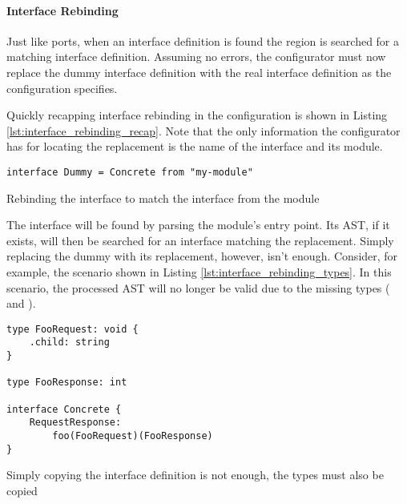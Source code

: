 \paragraph{Interface Rebinding}

Just like ports, when an interface definition is found the  region
is searched for a matching interface definition. Assuming no errors, the
configurator must now replace the dummy interface definition with the real
interface definition as the configuration specifies.

Quickly recapping interface rebinding in the configuration is shown in Listing
\ref{lst:interface_rebinding_recap}. Note that the only information the
configurator has for locating the replacement is the name of the interface and
its module.

\begin{listing}[H]
\begin{verbatim}
interface Dummy = Concrete from "my-module"
\end{verbatim}

\caption{Rebinding the interface  to match the interface
     from the module }

\label{lst:interface_rebinding_recap}

\end{listing}

The interface will be found by parsing the module's entry point. Its AST, if it
exists, will then be searched for an interface matching the replacement. Simply
replacing the dummy with its replacement, however, isn't enough. Consider, for
example, the scenario shown in Listing \ref{lst:interface_rebinding_types}. In
this scenario, the processed AST will no longer be valid due to the missing
types ( and ).

\begin{listing}[H]
\begin{verbatim}
type FooRequest: void {
    .child: string
}

type FooResponse: int

interface Concrete {
    RequestResponse:
        foo(FooRequest)(FooResponse)
}
\end{verbatim}

\caption{Simply copying the interface definition is not enough, the types must
    also be copied}

\label{lst:interface_rebinding_types}
\end{listing}

